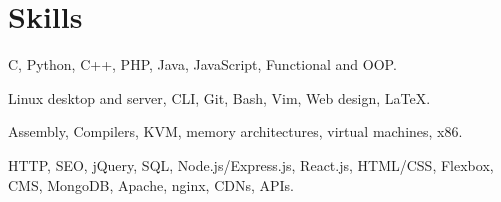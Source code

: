 \section{Skills}
{C, Python, C++, PHP, Java, JavaScript, Functional and OOP.}

{Linux desktop and server, CLI, Git, Bash, Vim, Web design, {\LaTeX}.}

{Assembly, Compilers, KVM, memory architectures, virtual machines, x86.}

{HTTP, SEO, jQuery, SQL, Node.js/Express.js, React.js, HTML/CSS, Flexbox, CMS, MongoDB, Apache, nginx, CDNs, APIs.}
